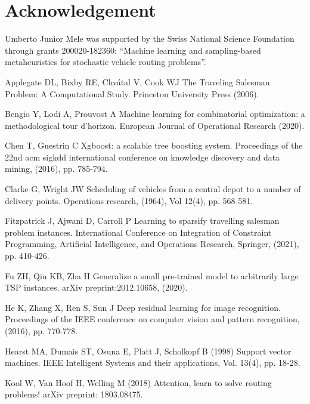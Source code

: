 \documentclass{article}
\begin{document}
\section*{Acknowledgement}
Umberto Junior Mele was supported by the Swiss National Science Foundation
through grants 200020-182360: ``Machine learning and sampling-based metaheuristics for stochastic vehicle routing problems''.




\begin{thebibliography}{99}

Applegate DL, Bixby RE, Chvátal V, Cook WJ 
\newblock The Traveling Salesman Problem: A Computational Study.
\newblock Princeton University Press (2006).


Bengio Y, Lodi A, Prouvost A 
\newblock Machine learning for combinatorial optimization: a methodological tour d’horizon.
\newblock European Journal of Operational Research (2020).

Chen T, Guestrin C
\newblock Xgboost: a scalable tree boosting system.
\newblock Proceedings of the 22nd acm sigkdd international conference on knowledge discovery and data mining, (2016), pp. 785-794.

Clarke G, Wright JW 
\newblock Scheduling of vehicles from a central depot to a number of delivery points.
\newblock Operations research, (1964), Vol 12(4), pp. 568-581.

Fitzpatrick J, Ajwani D, Carroll P 
\newblock Learning to sparsify travelling salesman problem instances.
\newblock International Conference on Integration of Constraint Programming, Artificial Intelligence, and Operations Research, Springer, (2021), pp. 410-426.

Fu ZH, Qiu KB, Zha H
\newblock Generalize a small pre-trained model to arbitrarily large TSP instances.
\newblock arXiv preprint:2012.10658, (2020).

He K, Zhang X, Ren S, Sun J
\newblock Deep residual learning for image recognition. 
\newblock Proceedings of the IEEE conference on computer vision and pattern recognition, (2016), pp. 770-778.

Hearst MA, Dumais ST, Osuna E, Platt J, Scholkopf B (1998)
\newblock Support vector machines.
\newblock IEEE Intelligent Systems and their applications, Vol. 13(4), pp. 18-28.


Kool W, Van Hoof H, Welling M (2018)
\newblock Attention, learn to solve routing problems!
\newblock arXiv preprint: 1803.08475.


\end{thebibliography}
\end{document}
